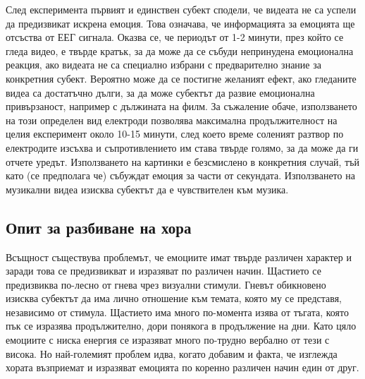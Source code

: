 \documentclass[main.tex]{subfiles}
\begin{document}
След експеримента първият и единствен субект сподели, че видеата не са успели да предизвикат искрена емоция. Това означава, че информацията за емоцията ще отсъства от ЕЕГ сигнала. Оказва се, че периодът от 1-2 минути, през който се гледа видео, е твърде кратък, за да може да се събуди непринудена емоционална реакция, ако видеата не са специално избрани с предварително знание за конкретния субект. Вероятно може да се постигне желаният ефект, ако гледаните видеа са достатъчно дълги, за да може субектът да развие емоционална привързаност, например с дължината на филм. За съжаление обаче, използването на този определен вид електроди позволява максимална продължителност на целия експеримент около 10-15 минути, след което време соленият разтвор по електродите изсъхва и съпротивлението им става твърде голямо, за да може да ги отчете уредът. Използването на картинки е безсмислено в конкретния случай, тъй като (се предполага че) събуждат емоция за части от секундата. Използването на музикални видеа изисква субектът да е чувствителен към музика. 

\subsection{Опит за разбиване на хора}
Всъщност съществува проблемът, че емоциите имат твърде различен характер и заради това се предизвикват и изразяват по различен начин. Щастието се предизвиква по-лесно от гнева чрез визуални стимули. Гневът обикновено изисква субектът да има лично отношение към темата, която му се представя, независимо от стимула. Щастието има много по-момента изява от тъгата, която пък се изразява продължително, дори понякога в продължение на дни. Като цяло емоциите с ниска енергия се изразяват много по-трудно вербално от тези с висока. Но най-големият проблем идва, когато добавим и факта, че изглежда хората възприемат и изразяват емоцията по коренно различен начин един от друг.
\end{document}
